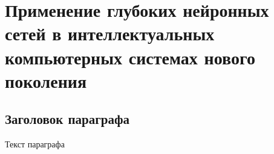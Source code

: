 
\chapter{Применение глубоких нейронных сетей в интеллектуальных компьютерных системах нового поколения}
\label{chapter_deep_ann}


\section{Заголовок параграфа}
Текст параграфа

%